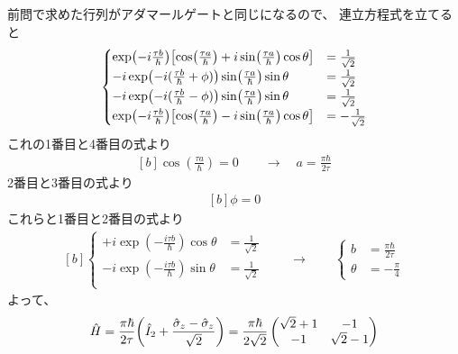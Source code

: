 \documentclass[../ap_2021.tex]{subfiles}
\begin{document}
\section{}
前問で求めた行列がアダマールゲートと同じになるので、
連立方程式を立てると
\begin{equation}\begin{aligned}[b]
    \begin{cases}
        \exp(-i\frac{\tau b}{\hbar})\qty[\cos(\frac{\tau a}{\hbar})+i\sin(\frac{\tau a}{\hbar})\cos\theta] &= \frac{1}{\sqrt{2}}\\
        -i\exp(-i(\frac{\tau b}{\hbar}+\phi))\sin(\frac{\tau a}{\hbar})\sin\theta\ &= \frac{1}{\sqrt{2}}\\
        -i\exp(-i(\frac{\tau b}{\hbar}-\phi))\sin(\frac{\tau a}{\hbar})\sin\theta\ &= \frac{1}{\sqrt{2}}\\
        \exp(-i\frac{\tau b}{\hbar})\qty[\cos(\frac{\tau a}{\hbar})-i\sin(\frac{\tau a}{\hbar})\cos\theta] &= -\frac{1}{\sqrt{2}}
    \end{cases}
\end{aligned}\end{equation}
これの1番目と4番目の式より
\begin{equation}\begin{aligned}[b]
    \cos(\frac{\tau a}{\hbar})=0\qquad \rightarrow \quad a = \frac{\pi\hbar}{2\tau}
\end{aligned}\end{equation}
2番目と3番目の式より
\begin{equation}\begin{aligned}[b]
    \phi = 0
\end{aligned}\end{equation}
これらと1番目と2番目の式より
\begin{equation}\begin{aligned}[b]
    \begin{cases}
        +i\exp(-\frac{i\tau b}{\hbar})\cos\theta &= \frac{1}{\sqrt{2}}\\
        -i\exp(-\frac{i\tau b}{\hbar})\sin\theta &= \frac{1}{\sqrt{2}}\\
    \end{cases}
    \qquad\rightarrow\qquad
    \begin{cases}
        b &= \frac{\pi\hbar}{2\tau}\\
        \theta &= -\frac{\pi}{4}
    \end{cases}
\end{aligned}\end{equation}
よって、
\begin{equation}\begin{aligned}[b]
    \hat{H}=\frac{\pi\hbar}{2\tau}\qty(\hat{I}_2+\frac{\hat{\sigma}_z-\hat{\sigma}_z}{\sqrt{2}})
    =\frac{\pi\hbar}{2\sqrt{2}}\begin{pmatrix}
        \sqrt{2}+1 & -1\\
        -1 & \sqrt{2}-1
    \end{pmatrix}
\end{aligned}\end{equation}
\end{document}
